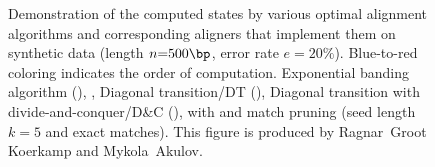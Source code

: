 \begin{figure}[t]
    \hspace{-8em}
    \hspace{2.5em}
    \caption[Behavior of various global alignment algorithms]{%
      Demonstration of the computed states by various optimal alignment
algorithms and corresponding aligners that implement them on synthetic data
(length $n{=}500\bp$, error rate $e{=}20\%$). Blue-to-red coloring indicates the
order of computation. \protect{} Exponential banding
algorithm (\edlib), \protect{} \dijkstra,
\protect{} Diagonal transition/DT (\oldwfa),
\protect{} Diagonal transition with
divide-and-conquer/D\&C (\wfa), \protect{} \A with \csh
and match pruning (seed length $k{=}5$ and exact matches). This figure is
produced by Ragnar~Groot Koerkamp and Mykola~Akulov.}
    \label{GLOBALfig:comparison}
\end{figure}
